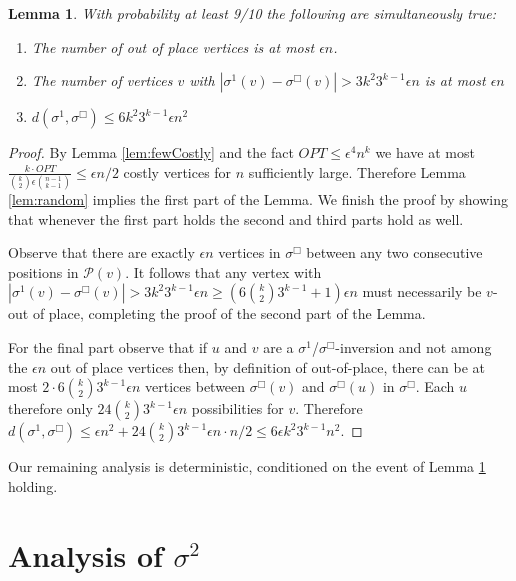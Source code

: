 \documentclass[dvips,11pt,letter]{article}
\newtheorem{lemma}[theorem]{Lemma}
\newcommand{\posns}{\mathcal{P}}
\newcommand{\roundOpt}{\sigma^{\Box}}
\begin{document}
\begin{lemma}\label{lem:piOne}
With probability at least 9/10 the following are simultaneously true:
\begin{enumerate}
\item The number of out of place vertices is at most $\epsilon n$.
\item The number of vertices $v$ with $|\sigma^1(v) - \roundOpt(v)| > 3 k^2 3^{k-1} \epsilon n$ is at most $\epsilon n$
\item $d(\sigma^1, \roundOpt) \le 6k^2 3^{k-1} \epsilon n^2$
\end{enumerate}
\end{lemma}
\begin{proof}
By Lemma \ref{lem:fewCostly} and the fact $OPT \le \epsilon^4 n^k$ we have at most $\frac{k \cdot OPT}{\binom{k}{2} \epsilon \binom{n-1}{k-1}} \le \epsilon n / 2$ costly vertices for $n$  sufficiently large. Therefore Lemma \ref{lem:random} implies the first part of the Lemma. We finish the proof by showing that whenever the first part holds the second and third parts hold as well.

Observe that there are exactly $\epsilon n$ vertices in $\roundOpt$ between any two consecutive positions in $\posns(v)$. It follows that any vertex with $|\sigma^1(v) - \roundOpt(v)| > 3k^2 3^{k-1} \epsilon n \ge (6 \binom{k}{2} 3^{k-1} + 1)\epsilon n$ must necessarily be $v$-out of place, completing the proof of the second part of the Lemma.

For the final part observe that if $u$ and $v$ are a $\sigma^1$/$\roundOpt$-inversion and not among the $\epsilon n$ out of place vertices then, by definition of out-of-place, there can be at most  $ 2 \cdot 6 \binom{k}{2} 3^{k-1}\epsilon n$ vertices between $\roundOpt(v)$ and $\roundOpt(u)$ in $\roundOpt$. Each $u$ therefore only $24 \binom{k}{2}3^{k-1}\epsilon n$ possibilities for $v$. Therefore $d(\sigma^1, \roundOpt) \le \epsilon n^2 + 24 \binom{k}{2}3^{k-1}\epsilon n \cdot n / 2 \le 6 \epsilon k^2 3^{k-1}n^2$.
\end{proof}

Our remaining analysis is deterministic, conditioned on the event of Lemma \ref{lem:piOne} holding.

\section{Analysis of $\sigma^2$} \label{sec:sigmaTwo}
\end{document}
